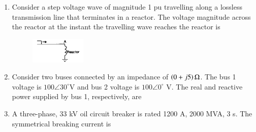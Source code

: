 \documentclass[12pt]{article}
\theoremstyle{remark}
\begin{document}
\begin{enumerate}
\item Consider a step voltage wave of magnitude 1 pu travelling along a lossless transmission line that terminates in a reactor. The voltage magnitude across the reactor at the instant the travelling wave reaches the reactor is
\begin{figure}[H]
    \centering
    \includegraphics[width=0.25\textwidth]{Figs/Q16.png}
    \caption{}
    \label{fig:1.9}
\end{figure}
\begin{enumerate}
\end{enumerate}
\hfill{}

\item Consider two buses connected by an impedance of $\left(0+j5\right) \Omega$. The bus 1 voltage is $100\angle30^{\circ}$V and bus 2 voltage is $100\angle0^{\circ}$ V. The real and reactive power supplied by bus 1, respectively, are
\begin{enumerate}
\end{enumerate}
\hfill{}

\item A three-phase, 33 kV oil circuit breaker is rated 1200 A, 2000 MVA, 3 s. The symmetrical breaking current is
\begin{enumerate}
\end{enumerate}
\hfill{}


\end{enumerate}
\end{document}
